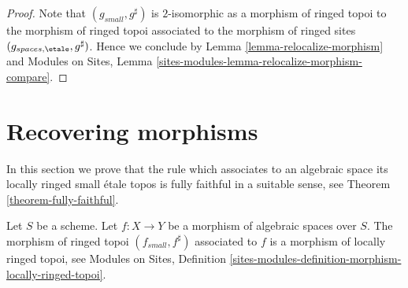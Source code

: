 \begin{proof}
Note that $(g_{small}, g^\sharp)$ is $2$-isomorphic as a
morphism of ringed topoi to the morphism of ringed topoi
associated to the morphism of ringed sites
$(g_{spaces, \etale}, g^\sharp)$. Hence we conclude by
Lemma \ref{lemma-relocalize-morphism}
and
Modules on Sites,
Lemma \ref{sites-modules-lemma-relocalize-morphism-compare}.
\end{proof}












\section{Recovering morphisms}
\label{section-morphisms}

\noindent
In this section we prove that the rule which associates to an algebraic space
its locally ringed small \'etale topos is fully faithful in a suitable
sense, see
Theorem \ref{theorem-fully-faithful}.

\begin{lemma}
\label{lemma-morphism-locally-ringed}
Let $S$ be a scheme.
Let $f : X \to Y$ be a morphism of algebraic spaces over $S$.
The morphism of ringed topoi $(f_{small}, f^\sharp)$
associated to $f$ is a morphism of locally ringed topoi, see
Modules on Sites,
Definition \ref{sites-modules-definition-morphism-locally-ringed-topoi}.
\end{lemma}


